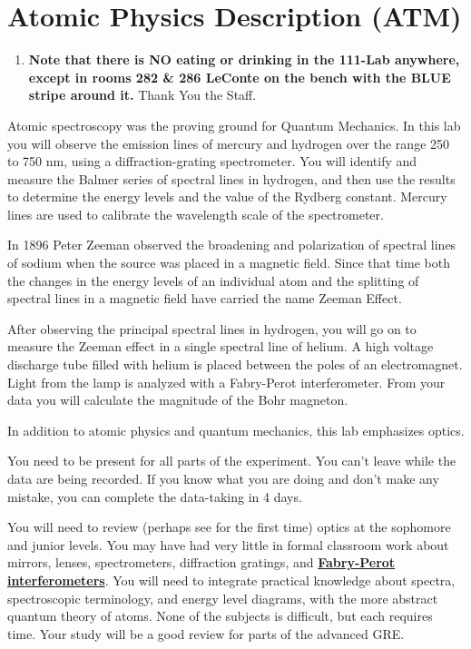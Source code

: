 \documentclass{../lab}
\begin{document}
\maketitle

\tableofcontents

\section{Atomic Physics Description (ATM)}

\begin{enumerate}
    \item \textbf{Note that there is NO eating or drinking in the 111-Lab anywhere, except in rooms 282 \& 286 LeConte on the bench with the BLUE stripe around it.} Thank You the Staff.

\end{enumerate}

Atomic spectroscopy was the proving ground for Quantum Mechanics. In this lab you will observe the emission lines of mercury and hydrogen over the range 250 to 750 nm, using a diffraction-grating spectrometer. You will identify and measure the Balmer series of spectral lines in hydrogen, and then use the results to determine the energy levels and the value of the Rydberg constant. Mercury lines are used to calibrate the wavelength scale of the spectrometer.

In 1896 Peter Zeeman observed the broadening and polarization of spectral lines of sodium when the source was placed in a magnetic field. Since that time both the changes in the energy levels of an individual atom and the splitting of spectral lines in a magnetic field have carried the name Zeeman Effect.

After observing the principal spectral lines in hydrogen, you will go on to measure the Zeeman effect in a single spectral line of helium. A high voltage discharge tube filled with helium is placed between the poles of an electromagnet. Light from the lamp is analyzed with a Fabry-Perot interferometer. From your data you will calculate the magnitude of the Bohr magneton.

In addition to atomic physics and quantum mechanics, this lab emphasizes optics.

You need to be present for all parts of the experiment. You can't leave while the data are being recorded. If you know what you are doing and don't make any mistake, you can complete the data-taking in 4 days.

You will need to review (perhaps see for the first time) optics at the sophomore and junior levels. You may have had very little in formal classroom work about mirrors, lenses, spectrometers, diffraction gratings, and \href{http://experimentationlab.berkeley.edu/sites/default/files/ATM/Etalons\_TechNote-3pages.pdf}{\textbf{Fabry-Perot interferometers}}. You will need to integrate practical knowledge about spectra, spectroscopic terminology, and energy level diagrams, with the more abstract quantum theory of atoms. None of the subjects is difficult, but each requires time. Your study will be a good review for parts of the advanced GRE.
\end{document}
